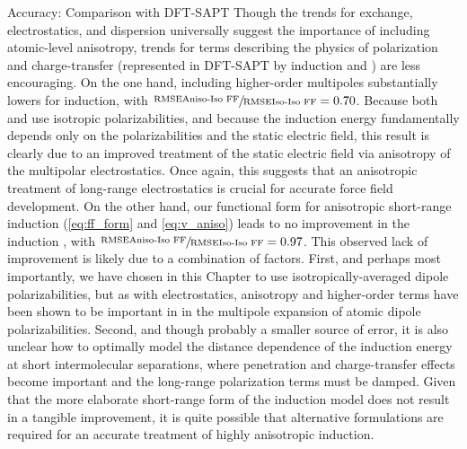 \begin{subsection}{Accuracy: Comparison with DFT-SAPT}
Though the trends for exchange, electrostatics, and dispersion universally
suggest the importance of including atomic-level anisotropy, trends for terms
describing the physics of polarization and charge-transfer (represented in
DFT-SAPT by induction and
\dhf) are less encouraging. On the one hand, including higher-order multipoles
substantially lowers \rmse for induction, with $\sfrac{\text{\rmse \isaff}}{\text{\rmse \isoff}} = 0.70$. 
Because both \isoff and \isaff use isotropic polarizabilities, and because the
induction energy fundamentally depends only on the polarizabilities and the
static electric field, this
result is clearly due to an improved treatment of the static electric field
via anisotropy of the multipolar electrostatics.
Once again, this
suggests that an 
anisotropic treatment of long-range electrostatics is crucial for accurate
force field development. On the other hand, our functional form for anisotropic short-range
induction (\cref{eq:ff_form} and \cref{eq:v_aniso}) leads to no improvement in the
induction \rmse, with $\sfrac{\text{\rmse \isaff}}{\text{\rmse \isoff}} =
0.97$. This observed lack of improvement is likely due to a combination of
factors. First, and perhaps most importantly,
we have chosen in this Chapter to use isotropically-averaged dipole
polarizabilities, but as with
electrostatics, anisotropy and higher-order terms have been shown to be important in in the multipole
expansion of atomic dipole polarizabilities. 
\cite{Stone2007,Misquitta2007a,Misquitta2008b,Misquitta2016,Harder2006}
Second, and though probably a smaller source of error,
it is also unclear how to optimally
model the distance dependence of the induction energy at short
intermolecular separations, where penetration and charge-transfer effects
become important and the long-range polarization terms must be damped. 
\cite{VanVleet2016,Liu2017,Misquitta2013,Thole1981} 
Given that the more elaborate short-range form of the 
\mastiff induction model does not result in a tangible improvement, it is quite possible
that alternative formulations are required for an accurate treatment of highly
anisotropic induction.



\end{subsection}
